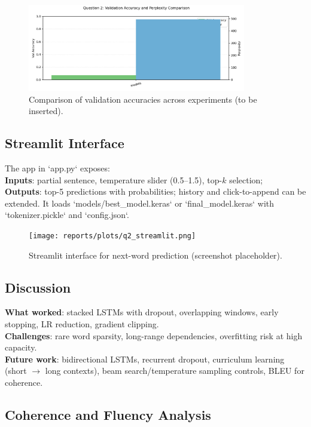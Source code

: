 \documentclass[12pt,a4paper]{article}
\begin{document}
\begin{figure}[H]
\centering
\includegraphics[width=0.85\textwidth]{reports/plots/q2_compare.png}
\caption{Comparison of validation accuracies across experiments (to be inserted).}
\label{fig:q2_compare}
\end{figure}

\subsection{Streamlit Interface}

The app in `app.py` exposes:\\
\textbf{Inputs}: partial sentence, temperature slider (0.5--1.5), top-$k$ selection;\\
\textbf{Outputs}: top-5 predictions with probabilities; history and click-to-append can be extended. It loads `models/best_model.keras` or `final_model.keras` with `tokenizer.pickle` and `config.json`.

\begin{figure}[H]
\centering
\texttt{[image: reports/plots/q2\_streamlit.png]}
\caption{Streamlit interface for next-word prediction (screenshot placeholder).}
\label{fig:q2_streamlit}
\end{figure}

\subsection{Discussion}

\textbf{What worked}: stacked LSTMs with dropout, overlapping windows, early stopping, LR reduction, gradient clipping.\\
\textbf{Challenges}: rare word sparsity, long-range dependencies, overfitting risk at high capacity.\\
\textbf{Future work}: bidirectional LSTMs, recurrent dropout, curriculum learning (short $\rightarrow$ long contexts), beam search/temperature sampling controls, BLEU for coherence.

\subsection{Coherence and Fluency Analysis}
\end{document}
